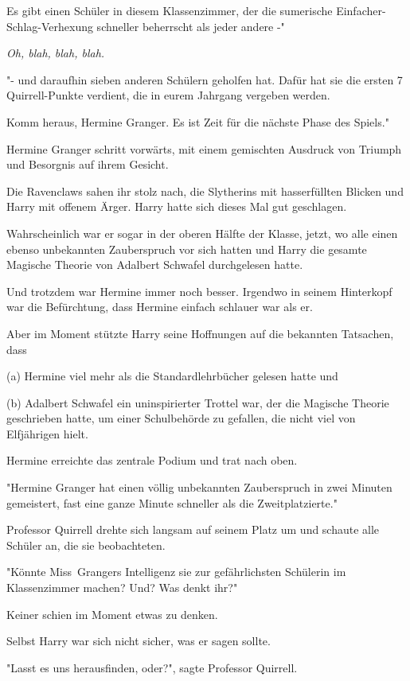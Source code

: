{Es gibt einen Schüler in diesem Klassenzimmer, der die sumerische Einfacher-Schlag-Verhexung schneller beherrscht als jeder andere -"

\emph{Oh, blah, blah, blah.}

"- und daraufhin sieben anderen Schülern geholfen hat. Dafür hat sie die ersten 7 Quirrell-Punkte verdient, die in eurem Jahrgang vergeben werden.

Komm heraus, Hermine Granger. Es ist Zeit für die nächste Phase des Spiels."

Hermine Granger schritt vorwärts, mit einem gemischten Ausdruck von Triumph und Besorgnis auf ihrem Gesicht.

Die Ravenclaws sahen ihr stolz nach, die Slytherins mit hasserfüllten Blicken und Harry mit offenem Ärger. Harry hatte sich dieses Mal gut geschlagen.

Wahrscheinlich war er sogar in der oberen Hälfte der Klasse, jetzt, wo alle einen ebenso unbekannten Zauberspruch vor sich hatten und Harry die gesamte Magische Theorie von Adalbert Schwafel durchgelesen hatte.

Und trotzdem war Hermine immer noch besser. Irgendwo in seinem Hinterkopf war die Befürchtung, dass Hermine einfach schlauer war als er.

Aber im Moment stützte Harry seine Hoffnungen auf die bekannten Tatsachen, dass

(a) Hermine viel mehr als die Standardlehrbücher gelesen hatte und

(b) Adalbert Schwafel ein uninspirierter Trottel war, der die Magische Theorie geschrieben hatte, um einer Schulbehörde zu gefallen, die nicht viel von Elfjährigen hielt.

Hermine erreichte das zentrale Podium und trat nach oben.

"Hermine Granger hat einen völlig unbekannten Zauberspruch in zwei Minuten gemeistert, fast eine ganze Minute schneller als die Zweitplatzierte."

Professor Quirrell drehte sich langsam auf seinem Platz um und schaute alle Schüler an, die sie beobachteten.

"Könnte Miss~Grangers Intelligenz sie zur gefährlichsten Schülerin im Klassenzimmer machen? Und? Was denkt ihr?"

Keiner schien im Moment etwas zu denken.

Selbst Harry war sich nicht sicher, was er sagen sollte.

"Lasst es uns herausfinden, oder?", sagte Professor Quirrell.

}
